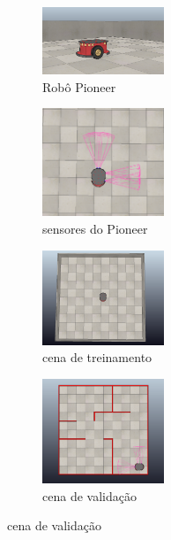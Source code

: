 \documentclass[
	12pt,				%
	openright,			%
	oneside,			%
	a4paper,			%
	brazil,				%
	]{abntex2}
\begin{document}
\begin{figure}[h]
\centering
	\begin{subfigure}{.5\textwidth}
		\centering
   		 \includegraphics[width = 0.4\textwidth]{Imagens/Pioneer.png}
    	 \caption{Robô Pioneer}
   		 \label{Pioneer}
    \end{subfigure}%
    \begin{subfigure}{.5\textwidth}
		\centering
   		 \includegraphics[width = 0.4\textwidth]{Imagens/Pioneer_sensors.png}
    	 \caption{ sensores do Pioneer}
   		 \label{Pioneer_sensors}
    \end{subfigure}
    
    \begin{subfigure}{.5\textwidth}
		\centering
   		 \includegraphics[width = 0.4\textwidth]{Imagens/scene_1.png}
    	 \caption{cena de treinamento}
   		 \label{scene_1}
    \end{subfigure}%
    \begin{subfigure}{.5\textwidth}
		\centering
   		 \includegraphics[width = 0.4\textwidth]{Imagens/scene_2.png}
    	 \caption{ cena de validação}
   		 \label{scene_2}
    \end{subfigure}
    
\end{figure}
\end{document}

